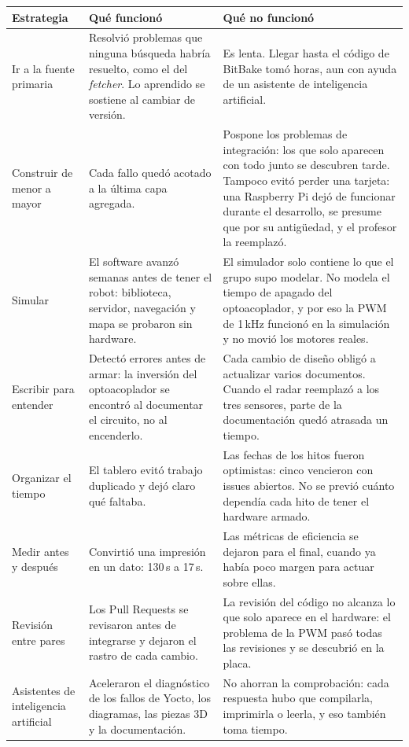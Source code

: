 \documentclass[11pt,a4paper]{article}
\begin{document}
\begin{longtable}{L{2.9cm}L{5.9cm}L{6.2cm}}
\toprule
\textbf{Estrategia} & \textbf{Qué funcionó} & \textbf{Qué no funcionó} \\
\midrule
\endhead
Ir a la fuente primaria & Resolvió problemas que ninguna búsqueda habría
resuelto, como el del \emph{fetcher}. Lo aprendido se sostiene al cambiar de
versión. & Es lenta. Llegar hasta el código de BitBake tomó horas, aun con
ayuda de un asistente de inteligencia artificial. \\
Construir de menor a mayor & Cada fallo quedó acotado a la última capa
agregada. & Pospone los problemas de integración: los que solo aparecen con
todo junto se descubren tarde. Tampoco evitó perder una tarjeta: una
Raspberry Pi dejó de funcionar durante el desarrollo, se presume que por su
antigüedad, y el profesor la reemplazó. \\
Simular & El software avanzó semanas antes de tener el robot: biblioteca,
servidor, navegación y mapa se probaron sin hardware. & El simulador solo
contiene lo que el grupo supo modelar. No modela el tiempo de apagado del
optoacoplador, y por eso la PWM de 1\,kHz funcionó en la simulación y no
movió los motores reales. \\
Escribir para entender & Detectó errores antes de armar: la inversión del
optoacoplador se encontró al documentar el circuito, no al encenderlo. & Cada
cambio de diseño obligó a actualizar varios documentos. Cuando el radar
reemplazó a los tres sensores, parte de la documentación quedó atrasada un
tiempo. \\
Organizar el tiempo & El tablero evitó trabajo duplicado y dejó claro qué
faltaba. & Las fechas de los hitos fueron optimistas: cinco vencieron con
issues abiertos. No se previó cuánto dependía cada hito de tener el hardware
armado. \\
Medir antes y después & Convirtió una impresión en un dato: 130\,s a 17\,s.
& Las métricas de eficiencia se dejaron para el final, cuando ya había poco
margen para actuar sobre ellas. \\
Revisión entre pares & Los Pull Requests se revisaron antes de integrarse y
dejaron el rastro de cada cambio. & La revisión del código no alcanza lo que
solo aparece en el hardware: el problema de la PWM pasó todas las revisiones
y se descubrió en la placa. \\
Asistentes de inteligencia artificial & Aceleraron el diagnóstico de los
fallos de Yocto, los diagramas, las piezas 3D y la documentación. & No
ahorran la comprobación: cada respuesta hubo que compilarla, imprimirla o
leerla, y eso también toma tiempo. \\
\bottomrule
\end{longtable}
\end{document}
